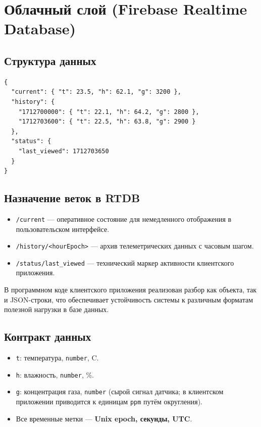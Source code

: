 \section{Облачный слой (Firebase Realtime Database)}

\subsection{Структура данных}

\begin{verbatim}
{
  "current": { "t": 23.5, "h": 62.1, "g": 3200 },
  "history": {
    "1712700000": { "t": 22.1, "h": 64.2, "g": 2800 },
    "1712703600": { "t": 22.5, "h": 63.8, "g": 2900 }
  },
  "status": {
    "last_viewed": 1712703650
  }
}
\end{verbatim}

\subsection{Назначение веток в RTDB}

\begin{itemize}
    \item \texttt{/current} --- оперативное состояние для немедленного отображения в пользовательском интерфейсе.
    \item \texttt{/history/<hourEpoch>} --- архив телеметрических данных с часовым шагом.
    \item \texttt{/status/last\_viewed} --- технический маркер активности клиентского приложения.
\end{itemize}

В программном коде клиентского приложения реализован разбор как объекта, так и JSON-строки, что обеспечивает устойчивость системы к различным форматам полезной нагрузки в базе данных.

\subsection{Контракт данных}

\begin{itemize}
    \item \texttt{t}: температура, \texttt{number}, \textdegree C.
    \item \texttt{h}: влажность, \texttt{number}, \%.
    \item \texttt{g}: концентрация газа, \texttt{number} (сырой сигнал датчика; в клиентском приложении приводится к единицам \texttt{ppm} путём округления).
    \item Все временные метки --- \textbf{Unix epoch, секунды, UTC}.
\end{itemize}

